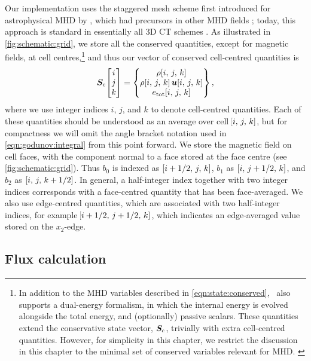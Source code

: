 Our implementation uses the staggered mesh scheme first introduced for astrophysical MHD by \citet{Evans88a}, which had precursors in other MHD fields \citep[\eg][]{Yee66a, Brecht81a}; today, this approach is standard in essentially all 3D CT schemes \citep[\eg][]{Fromang06a, Gardiner08a, Li12a}. As illustrated in \cref{fig:schematic:grid}, we store all the conserved quantities, except for magnetic fields, at cell centres,\footnote{
    In addition to the MHD variables described in \cref{eqn:state:conserved}, \quokka~also supports a dual-energy formalism, in which the internal energy is evolved alongside the total energy, and (optionally) passive scalars. These quantities extend the conservative state vector, $\bm{S}_\mathrm{c}$, trivially with extra cell-centred quantities. However, for simplicity in this chapter, we restrict the discussion in this chapter to the minimal set of conserved variables relevant for MHD.
    \label{fnote:dual-energy}
}
and thus our vector of conserved cell-centred quantities is
\begin{align}
    \bm{S}_\mathrm{c}\!\begin{bmatrix}i\\j\\k\end{bmatrix}
        = \begin{Bmatrix}
            \rho\!\left[ i,\,j,\,k \right] \\
            \rho\!\left[ i,\,j,\,k \right] \bm{u}\!\left[ i,\,j,\,k \right] \\
            e_\mathrm{tot}\!\left[ i,\,j,\,k \right]
        \end{Bmatrix}
    , \label{eqn:state:conserved}
\end{align}
where we use integer indices $i$, $j$, and $k$ to denote cell-centred quantities. Each of these quantities should be understood as an average over cell $\!\left[ i,\,j,\,k \right]$, but for compactness we will omit the angle bracket notation used in \cref{eqn:godunov:integral} from this point forward. We store the magnetic field on cell faces, with the component normal to a face stored at the face centre (see \cref{fig:schematic:grid}). Thus $b_0$ is indexed as $\,\!\left[ i + 1/2,\,j,\,k \right]$, $b_1$ as $\,\!\left[ i,\,j + 1/2,\,k \right]$, and $b_2$ as $\,\!\left[ i,\,j,\,k + 1/2 \right]$. In general, a half-integer index together with two integer indices corresponds with a face-centred quantity that has been face-averaged. We also use edge-centred quantities, which are associated with two half-integer indices, for example $\!\left[ i + 1/2,\,j + 1/2,\,k \right]$, which indicates an edge-averaged value stored on the $x_2$-edge.

\subsection{Flux calculation}
\label{sec:methods:flux}

